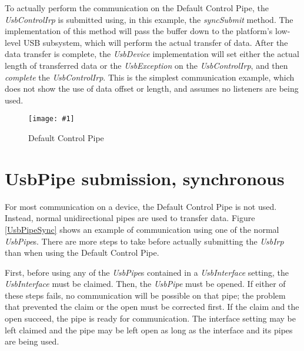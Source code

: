\documentclass{article}
\newcommand{\myclass}[1]{\emph{#1}}
\newcommand{\myinterface}[1]{\emph{#1}}
\newcommand{\mymethod}[1]{\emph{#1}}
\newcommand{\mysectionend}[0]{\vfill\pagebreak[1]}
\newcommand{\myfigure}[3]{\begin{figure}[htbp]\centering\texttt{[image: \#1]}\caption{#2}\label{#3}\end{figure}}
\begin{document}
To actually perform the communication on the Default Control Pipe, the
\myinterface{UsbControlIrp} is submitted using, in this example, the \mymethod{syncSubmit}
method.  The implementation of this method will pass the buffer down to the
platform's low-level USB subsystem, which will perform the actual transfer of
data.  After the data transfer is complete, the \myinterface{UsbDevice} implementation will
set either the actual length of transferred data or the \myclass{UsbException} on the
\myinterface{UsbControlIrp}, and then \mymethod{complete} the \myinterface{UsbControlIrp}.  This is the
simplest communication example, which does not show the use of data offset or
length, and assumes no listeners are being used.

\myfigure{figs/DCP}{Default Control Pipe}{DCP}

\mysectionend

%

\section{UsbPipe submission, synchronous}

For most communication on a device, the Default Control Pipe is not used.
Instead, normal unidirectional pipes are used to transfer data.  Figure
\ref{UsbPipeSync} shows an example of communication using one of the normal
\myinterface{UsbPipe}s.  There are more steps to take before actually submitting the \myinterface{UsbIrp}
than when using the Default Control Pipe.

First, before using any of the \myinterface{UsbPipe}s contained in a \myinterface{UsbInterface} setting,
the \myinterface{UsbInterface} must be claimed.  Then, the \myinterface{UsbPipe} must be opened.  If either
of these steps fails, no communication will be possible on that pipe; the
problem that prevented the claim or the open must be corrected first.  If the
claim and the open succeed, the pipe is ready for communication.  The interface
setting may be left claimed and the pipe may be left open as long as the
interface and its pipes are being used.
\end{document}
